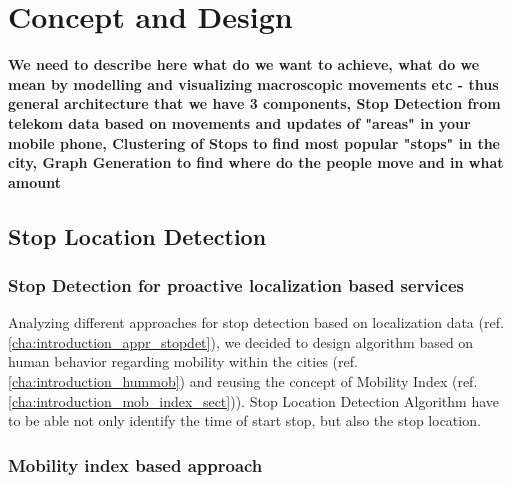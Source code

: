 \chapter{Concept and Design}
\label{cha:conceptanddesign}

\textbf{We need to describe here what do we want to achieve, what do we mean by modelling and visualizing macroscopic movements etc - thus general architecture that we have 3 components, Stop Detection from telekom data based on movements and updates of "areas" in your mobile phone, Clustering of Stops to find most popular "stops" in the city, Graph Generation to find where do the people move and in what amount
}
\section{Stop Location Detection}

\subsection{Stop Detection for proactive localization based services}

Analyzing different approaches for stop detection based on localization data (ref. \autoref{cha:introduction_appr_stopdet}), we decided to design algorithm based on human behavior regarding mobility within the cities (ref. \autoref{cha:introduction_hummob}) and reusing the concept of Mobility Index (ref. \autoref{cha:introduction_mob_index_sect})). Stop Location Detection Algorithm have to be able not only identify the time of start stop, but also the stop location.

\subsection{Mobility index based approach}

